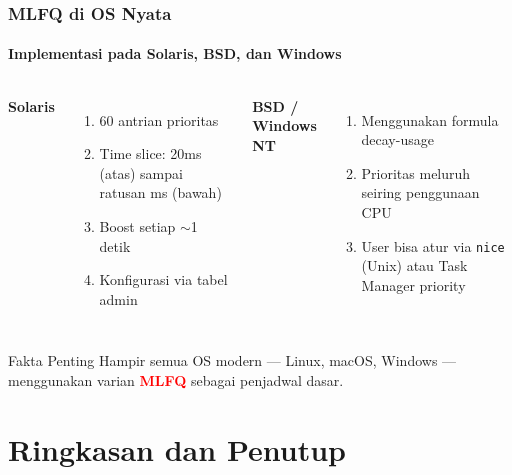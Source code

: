 \documentclass[t,aspectratio=169,xcolor=dvipsnames]{beamer}
\newcommand{\tem}[1]{\textbf{\textcolor{red}{#1}}}
\begin{document}
\begin{frame}
    \frametitle{MLFQ di OS Nyata}
    \framesubtitle{Implementasi pada Solaris, BSD, dan Windows}
    \small
    \begin{columns}[T]
        \textbf{Solaris}
        \begin{enumerate}
            \item 60 antrian prioritas
            \item Time slice: 20ms (atas) sampai ratusan ms (bawah)
            \item Boost setiap $\sim$1 detik
            \item Konfigurasi via tabel admin
        \end{enumerate}
        \textbf{BSD / Windows NT}
        \begin{enumerate}
            \item Menggunakan formula decay-usage
            \item Prioritas meluruh seiring penggunaan CPU
            \item User bisa atur via \texttt{nice} (Unix) atau Task Manager priority
        \end{enumerate}
    \end{columns}
    \begin{block}{Fakta Penting}
        Hampir semua OS modern --- Linux, macOS, Windows --- menggunakan varian \tem{MLFQ} sebagai penjadwal dasar.
    \end{block}
\end{frame}

\section{Ringkasan dan Penutup}
\end{document}

